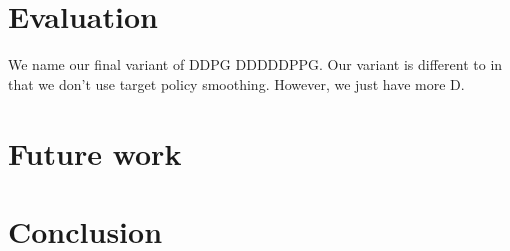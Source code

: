\documentclass[hyperref,german,beleg]{cgvpub}
\begin{document}
\chapter{Evaluation}

We name our final variant of \ac{DDPG} \ac{DDDDDPPG}. Our variant is different to \cite{fujimotoAddressingFunctionApproximation2018} in that we don't use target policy smoothing. However, we just have more D.


\chapter{Future work}


\chapter{Conclusion}

\end{document}
